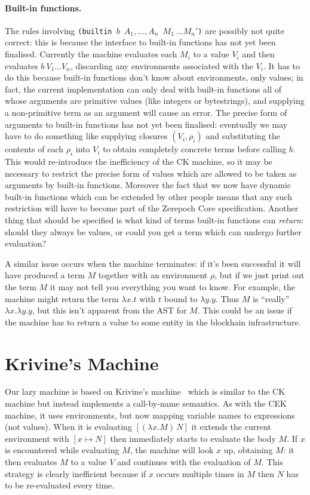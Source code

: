 \documentclass[a4paper]{article}
\begin{document}
\paragraph{Built-in functions.} The rules involving \texttt{(builtin $b$\ $A_1, \ldots, A_n$
  $M_1\ \ldots M_n'$)} are possibly not quite correct: this is because
the interface to built-in functions has not yet been finalised.
Currently the machine evaluates each $M_i$ to a value $V_i$ and then
evaluates $b\ V_1 \ldots V_n$, discarding any environments associated
with the $V_i$.  It has to do this because built-in functions don't
know about environments, only values; in fact, the current
implementation can only deal with built-in functions all of whose
arguments are primitive values (like integers or bytestrings), and
supplying a non-primitive term as an argument will cause an error.
The precise form of arguments to built-in functions has not yet been
finalised: eventually we may have to do something like supplying
closures $(V_i, \rho_i)$ and substituting the contents of each
$\rho_i$ into $V_i$ to obtain completely concrete terms before calling
$b$.  This would re-introduce the inefficiency of the CK machine, so
it may be necessary to restrict the precise form of values which are
allowed to be taken as arguments by built-in functions. Moreover the
fact that we now have dynamic built-in functions which can be extended
by other people means that any such restriction will have to become
part of the Zerepoch Core specification.  Another thing that should be
specified is what kind of terms built-in functions can
\textit{return}: should they always be values, or could you get a term
which can undergo further evaluation?

A similar issue occurs when the machine terminates: if it's been
successful it will have produced a term $M$ together with an
environment $\rho$, but if we just print out the term $M$ it may not
tell you everything you want to know.  For example, the machine might
return the term $\lambda x.t$ with $t$ bound to $\lambda y.y$.  Thus
$M$ is ``really'' $\lambda x.\lambda y.y$, but this isn't apparent
from the AST for $M$.  This could be an issue if the machine has to
return a value to some entity in the blockhain infrastructure.  




\section{Krivine's Machine}
Our lazy machine is based on Krivine's machine~\cite{Krivine} which is
similar to the CK machine but instead implements a call-by-name
semantics.  As with the CEK machine, it uses environments, but now
mapping variable names to expressions (not values).  When it is
evaluating $[(\lambda x.M)\, N]$ it extends the current environment with
$[x \mapsto N]$ then immediately starts to evaluate the body $M$.  If
$x$ is encountered while evaluating $M$, the machine will look $x$ up,
obtaining $M$: it then evaluates $M$ to a value $V$ and continues with
the evaluation of $M$.  This strategy is clearly inefficient because
if $x$ occurs multiple times in $M$ then $N$ has to be re-evaluated
every time.
\end{document}
